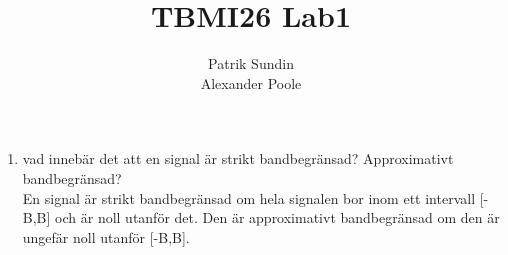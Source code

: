 \documentclass[a4paper,12pt]{article}
\title{TBMI26 Lab1}
\author{Patrik Sundin \\Alexander Poole\\}
\begin{document}
\maketitle
	\thispagestyle{empty}
\newpage

\begin{enumerate}

  \item vad innebär det att en signal är strikt bandbegränsad? Approximativt bandbegränsad? \hfill \\
    En signal är strikt bandbegränsad om hela signalen bor inom ett intervall [-B,B] och är noll utanför det. Den är approximativt bandbegränsad om den är ungefär noll utanför [-B,B].

\end{enumerate}
\end{document}
